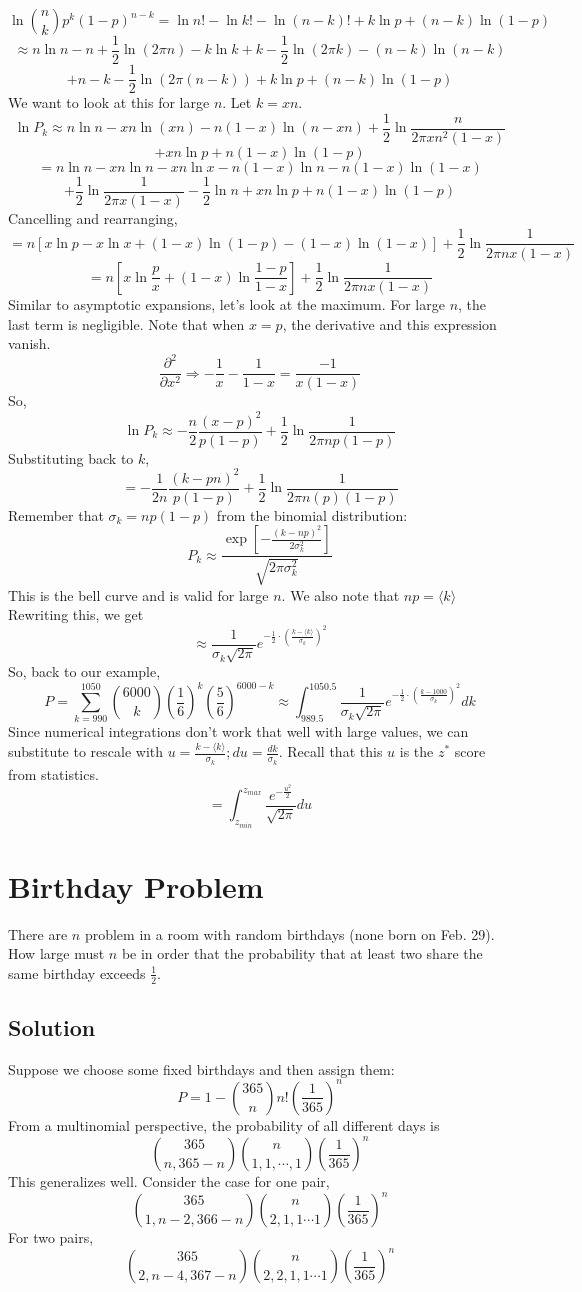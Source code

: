 \documentclass[../main.tex]{subfiles}
\newcommand{\expect}[1]{{\langle #1 \rangle}}
\begin{document}
$$\ln {n\choose k}p^{k}(1-p)^{n-k}=\ln n! - \ln k! - \ln (n-k)! + k\ln p + (n-k)\ln (1-p)$$
$$\approx n\ln n - n+ \frac{1}{2}\ln (2\pi n)-k\ln k+k-\frac{1}{2}\ln(2\pi k)-(n-k)\ln(n-k)$$
$$+n-k-\frac{1}{2}\ln(2\pi (n-k))+k\ln p + (n-k)\ln (1-p)$$
We want to look at this for large $n$. Let $k=xn$.
$$\ln P_{k}\approx n\ln n - xn\ln(xn)-n(1-x)\ln(n-xn)+\frac{1}{2}\ln \frac{n}{2\pi xn^{2}(1-x)}$$
$$+xn\ln p + n(1-x)\ln(1-p)$$
$$=n\ln n - xn\ln n - xn\ln x - n(1-x)\ln n - n(1-x)\ln(1-x)$$
$$+\frac{1}{2}\ln\frac{1}{2\pi x(1-x)}-\frac{1}{2}\ln n+xn\ln p+n(1-x)\ln(1-p)$$
Cancelling and rearranging,
$$=n\left[x\ln p -x\ln x+(1-x)\ln(1-p)-(1-x)\ln (1-x)\right]+\frac{1}{2}\ln\frac{1}{2\pi n x(1-x)}$$
$$=n\left[x\ln\frac{p}{x}+(1-x)\ln \frac{1-p}{1-x}\right]+\frac{1}{2}\ln\frac{1}{2\pi n x(1-x)}$$
Similar to asymptotic expansions, let's look at the maximum. For large $n$, the last term is negligible.
Note that when $x=p$, the derivative and this expression vanish. 
$$\frac{\partial^{2}}{\partial x^{2}}\Rightarrow -\frac{1}{x}-\frac{1}{1-x}=\frac{-1}{x(1-x)}$$
So,
$$\ln P_{k}\approx -\frac{n}{2}\frac{(x-p)^{2}}{p(1-p)}+\frac{1}{2}\ln\frac{1}{2\pi n p(1-p)}$$
Substituting back to $k$,
$$=-\frac{1}{2n}\frac{(k-pn)^{2}}{p(1-p)}+\frac{1}{2}\ln\frac{1}{2\pi n (p)(1-p)}$$
Remember that $\sigma_{k}=np(1-p)$ from the binomial distribution:
$$P_{k}\approx \frac{\exp\left[-\frac{(k-np)^{2}}{2\sigma_{k}^{2}}\right]}{\sqrt{2\pi \sigma_{k}^{2}}}$$
This is the bell curve and is valid for large $n$. We also note that $np=\expect{k}$
Rewriting this, we get
$$\approx \frac{1}{\sigma_{k}\sqrt{2\pi}}e^{-\frac{1}{2}\cdot \left(\frac{k-\expect{k}}{\sigma_{k}}\right)^{2}}$$
So, back to our example,
$$P=\sum_{k=990}^{1050}{6000 \choose k}\left(\frac{1}{6}\right)^{k}\left(\frac{5}{6}\right)^{6000-k}
\approx\int_{989.5}^{1050.5}\frac{1}{\sigma_{k}\sqrt{2\pi}}e^{-\frac{1}{2}\cdot \left(\frac{k-1000}{\sigma_{k}}\right)^{2}}dk$$
Since numerical integrations don't work that well with large values, we can substitute to rescale with $u=\frac{k-\expect{k}}{\sigma_{k}};du=\frac{dk}{\sigma_{k}}$.
Recall that this $u$ is the $z^{*}$ score from statistics.
$$=\int_{z_{min}}^{z_{max}}\frac{e^{-\frac{u^{2}}{2}}}{\sqrt{2\pi}}du$$

\section{Birthday Problem}
There are $n$ problem in a room with random birthdays (none born on Feb. 29). How large must $n$ be
in order that the probability that at least two share the same birthday exceeds $\frac{1}{2}$.

\subsection{Solution}
Suppose we choose some fixed birthdays and then assign them:
$$P=1-{365\choose n}n!\left(\frac{1}{365}\right)^{n}$$
From a multinomial perspective, the probability of all different days is
$${365\choose n,365-n}{n\choose 1,1,\cdots,1}\left(\frac{1}{365}\right)^{n}$$
This generalizes well. Consider the case for one pair,
$${365 \choose 1,n-2,366-n}{n\choose 2,1,1\cdots 1}\left(\frac{1}{365}\right)^{n}$$
For two pairs,
$${365\choose 2,n-4, 367-n}{n\choose 2,2,1,1\cdots 1}\left(\frac{1}{365}\right)^{n}$$
\end{document}
